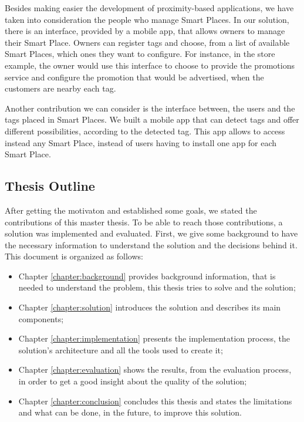 Besides making easier the development of proximity-based applications, we have taken into consideration the people who manage Smart Places.
In our solution, there is an interface, provided by a mobile app, that allows owners to manage their Smart Place. Owners can register tags and choose, from a list of available Smart Places, which ones they want to configure.
For instance, in the store example, the owner would use this interface to choose to provide the promotions service and configure the promotion that would be advertised, when the customers are nearby each tag.

Another contribution we can consider is the interface between, the users and the tags placed in Smart Places.
We built a mobile app that can detect tags and offer different possibilities, according to the detected tag.
This app allows to access instead any Smart Place, instead of users having to install one app for each Smart Place.

\subsection{Thesis Outline}
\label{sec:introduction_thesis_outline}
After getting the motivaton and established some goals, we stated the contributions of this master thesis.
To be able to reach those contributions, a solution was implemented and evaluated.
First, we give some background to have the necessary information to understand the solution and the decisions behind it.
This document is organized as follows:
\begin{itemize}
  \item Chapter \ref{chapter:background}
  provides background information, that is needed to understand the problem, this thesis tries to solve and the solution;
  \item Chapter \ref{chapter:solution}
  introduces the solution and describes its main components;
  \item Chapter \ref{chapter:implementation}
  presents the implementation process, the solution's architecture and all the tools used to create it;
  \item Chapter \ref{chapter:evaluation}
  shows the results, from the evaluation process, in order to get a good insight about the quality of the solution;
  \item Chapter \ref{chapter:conclusion}
  concludes this thesis and states the limitations and what can be done, in the future, to improve this solution.
\end{itemize}
